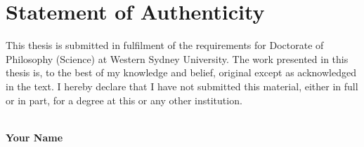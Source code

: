 \chapter*{Statement of Authenticity}
 \thispagestyle{plain}


This thesis is submitted in fulfilment of the requirements for Doctorate of Philosophy (Science) at Western Sydney University. The work presented in this thesis is, to the best of my knowledge and belief, original except as acknowledged in the text. I hereby declare that I have not submitted this material, either in full or in part, for a degree at this or any other institution. 
 
 \vspace{1cm}
 \begin{flushright}
 	\hspace{10cm}\hrulefill\\
 	\vspace{0.5cm}
 	\large
 	\textbf{Your Name}
 \end{flushright}
